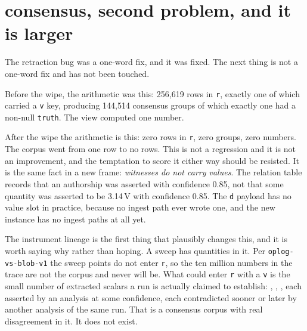 \section{consensus, second problem, and it is larger}

The retraction bug was a one-word fix, and it was fixed. The next thing is not a one-word fix and has not been touched.

Before the wipe, the arithmetic was this: 256{,}619 rows in \texttt{r}, exactly one of which carried a \texttt{v} key, producing 144{,}514 consensus groups of which exactly one had a non-null \texttt{truth}. The view computed one number.

After the wipe the arithmetic is this: zero rows in \texttt{r}, zero groups, zero numbers. The corpus went from one row to no rows. This is not a regression and it is not an improvement, and the temptation to score it either way should be resisted. It is the same fact in a new frame: \emph{witnesses do not carry values}. The relation table records that an authorship was asserted with confidence 0.85, not that some quantity was asserted to be 3.14\,V with confidence 0.85. The \texttt{d} payload has no value slot in practice, because no ingest path ever wrote one, and the new instance has no ingest paths at all yet.

The instrument lineage is the first thing that plausibly changes this, and it is worth saying why rather than hoping. A \labColdSystemShort{} sweep has quantities in it. Per \texttt{oplog-vs-blob-v1} the sweep points do not enter \texttt{r}, so the ten million numbers in the trace are not the corpus and never will be. What could enter \texttt{r} with a \texttt{v} is the small number of extracted scalars a run is actually claimed to establish: \labScalar, \labScalarAlt, \labScalarAltTwo, each asserted by an analysis at some confidence, each contradicted sooner or later by another analysis of the same run. That is a consensus corpus with real disagreement in it. It does not exist.

